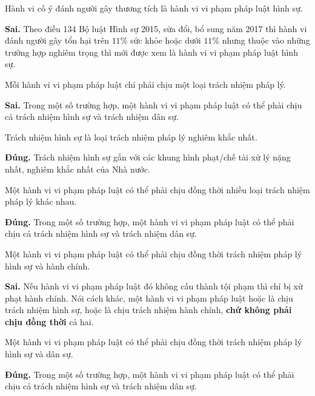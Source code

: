 \begin{ques}
Hành vi cố ý đánh người gây thương tích là hành vi vi phạm pháp luật hình sự.
\end{ques}
\begin{ans}
\textbf{Sai.} Theo điều 134 Bộ luật Hình sự 2015, sửa đổi, bổ sung năm 2017 thì hành vi đánh người gây tổn hại trên $11\%$ sức khỏe hoặc dưới $11\%$ nhưng thuộc vào những trường hợp nghiêm trọng thì mới được xem là hành vi vi phạm pháp luật hình sự.
\end{ans}

\begin{ques}
Mỗi hành vi vi phạm pháp luật chỉ phải chịu một loại trách nhiệm pháp lý.
\end{ques}
\begin{ans}
\textbf{Sai.} Trong một số trường hợp, một hành vi vi phạm pháp luật có thể phải chịu cả trách nhiệm hình sự và trách nhiệm dân sự.
\end{ans}

\begin{ques}
Trách nhiệm hình sự là loại trách nhiệm pháp lý nghiêm khắc nhất.
\end{ques}
\begin{ans}
\textbf{Đúng.} Trách nhiệm hình sự gắn với các khung hình phạt/chế tài xử lý nặng nhất, nghiêm khắc nhất của Nhà nước.
\end{ans}

\begin{ques}
Một hành vi vi phạm pháp luật có thể phải chịu đồng thời nhiều loại trách nhiệm pháp lý khác nhau.
\end{ques}
\begin{ans}
\textbf{Đúng.} Trong một số trường hợp, một hành vi vi phạm pháp luật có thể phải chịu cả trách nhiệm hình sự và trách nhiệm dân sự.
\end{ans}

\begin{ques}
Một hành vi vi phạm pháp luật có thể phải chịu đồng thời trách nhiệm pháp lý hình sự và hành chính.
\end{ques}
\begin{ans}
\textbf{Sai.} Nếu hành vi vi phạm pháp luật đó không cấu thành tội phạm thì chỉ bị xử phạt hành chính. Nói cách khác, một hành vi vi phạm pháp luật hoặc là chịu trách nhiệm hình sự, hoặc là chịu trách nhiệm hành chính, \textbf{chứ không phải chịu đồng thời} cả hai.
\end{ans}

\begin{ques}
Một hành vi vi phạm pháp luật có thể phải chịu đồng thời trách nhiệm pháp lý hình sự và dân sự.
\end{ques}
\begin{ans}
\textbf{Đúng.} Trong một số trường hợp, một hành vi vi phạm pháp luật có thể phải chịu cả trách nhiệm hình sự và trách nhiệm dân sự.
\end{ans}

